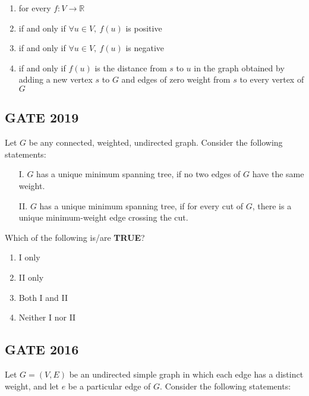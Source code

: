 \begin{enumerate}[label=(\alph*)]
    \item for every $f: V \rightarrow \mathbb{R}$
    \item if and only if $\forall u \in V,\ f(u)$ is positive
    \item if and only if $\forall u \in V,\ f(u)$ is negative
    \item if and only if $f(u)$ is the distance from $s$ to $u$ in the graph obtained by adding a new vertex $s$ to $G$ and edges of zero weight from $s$ to every vertex of $G$
\end{enumerate}

\subsection*{GATE 2019}
Let $G$ be any connected, weighted, undirected graph. Consider the following statements:

\begin{itemize}
    \item[I.] $G$ has a unique minimum spanning tree, if no two edges of $G$ have the same weight.
    \item[II.] $G$ has a unique minimum spanning tree, if for every cut of $G$, there is a unique minimum-weight edge crossing the cut.
\end{itemize}

Which of the following is/are \textbf{TRUE}?

\begin{enumerate}[label=(\alph*)]
    \item I only
    \item II only
    \item Both I and II
    \item Neither I nor II
\end{enumerate}

\subsection*{GATE 2016}
Let $G = (V, E)$ be an undirected simple graph in which each edge has a distinct weight, and let $e$ be a particular edge of $G$. Consider the following statements:

